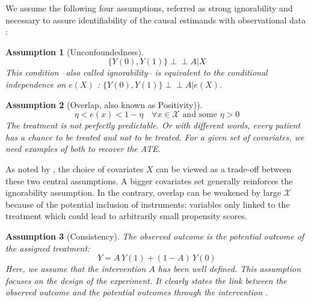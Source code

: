 \documentclass[11pt]{article}
\let\cite=\supercite
\newcommand{\indep}{\perp \!\!\! \perp}
\newtheorem{assumption}{Assumption}
\begin{document}
\begin{appendices}
    We assume the following four assumptions, referred as strong ignorability and
    necessary to assure identifiability of the causal estimands with observational
    data \cite{rubin_causal_2005}:
    \begin{assumption}[Unconfoundedness]\label{assumption:ignorability}
        \begin{equation*}\label{eq:ignorability}
            \{Y(0), Y(1) \} \indep A | X
        \end{equation*}
        This condition --also called ignorability-- is equivalent to the conditional
        independence on $e(X)$ \cite{rosenbaum_central_1983}: $\{Y(0), Y(1) \}
            \indep  A | e(X)$.
    \end{assumption}


    \begin{assumption}[Overlap, also known as Positivity)]\label{assumption:overlap}
        \begin{equation*}\label{eq:overlap}
            \eta < e(x) < 1 - \eta \quad \forall x \in \mathcal X \text{ and some } \eta > 0
        \end{equation*}
        The treatment is not perfectly predictable. Or with different words, every
        patient has a chance to be treated and not to be treated. For a given set of
        covariates, we need examples of both to recover the ATE.
    \end{assumption}

    As noted by \cite{damour_overlap_2020}, the choice of covariates $X$ can
    be viewed as a trade-off between these two central assumptions. A bigger
    covariates set generally reinforces the ignorability assumption. In the
    contrary, overlap can be weakened by large $\mathcal{X}$ because of the
    potential inclusion of instruments: variables only linked to the treatment which
    could lead to arbitrarily small propensity scores.


    \begin{assumption}[Consistency]\label{assumption:consistency} The observed
        outcome is the potential outcome of the assigned treatment:
        \begin{equation*}\label{eq:consistancy}
            Y = A \, Y(1) + (1-A) \, Y(0)
        \end{equation*}
        Here, we assume that the intervention $A$ has been well defined. This
        assumption focuses on the design of the experiment. It clearly states the link
        between the observed outcome and the potential outcomes through the
        intervention \cite{hernan_causal_2020}.
    \end{assumption}


\end{appendices}
\end{document}
